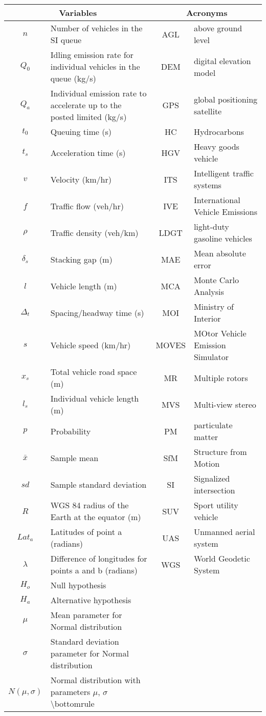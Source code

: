 \documentclass[preprint,12pt,a4paper]{elsarticle}
\begin{document}
\begin{linenumbers}
\begin{frontmatter}
\begin{tabular}{@{}cp{5cm} |cl@{}}
\toprule
\multicolumn{2}{c}{\textbf{Variables}} & \multicolumn{2}{c}{\textbf{Acronyms}} \\ \midrule
$n$ & Number of vehicles in the SI queue & AGL & above ground level \\
$Q_{0}$ & Idling emission rate for individual vehicles in the queue (kg/s) & DEM & digital elevation model \\
$Q_{a}$ & Individual emission rate to accelerate up to the posted limited (kg/s) & GPS & global positioning satellite \\
$t_{0}$ & Queuing time (s) & HC & Hydrocarbons \\
$t_{s}$ & Acceleration time (s) & HGV & Heavy goods vehicle \\
$v$ & Velocity (km/hr) & ITS & Intelligent traffic systems \\
$f$ & Traffic flow (veh/hr) & IVE & International Vehicle Emissions \\
$\rho$ & Traffic density (veh/km) & LDGT & light-duty gasoline vehicles \\
$\delta_{s}$ & Stacking gap (m) & MAE & Mean absolute error \\
$l$ & Vehicle length (m) & MCA & Monte Carlo Analysis \\
$\Delta_{t}$ & Spacing/headway time (s) & MOI & Ministry of Interior \\
$s$ & Vehicle speed (km/hr) & MOVES & MOtor Vehicle Emission Simulator \\
$x_{s}$ & Total vehicle road space (m) & MR & Multiple rotors \\
$l_{s}$ & Individual vehicle length (m) & MVS & Multi-view stereo \\
$p$ & Probability & PM & particulate matter \\
$\bar{x}$ & Sample mean & SfM & Structure from Motion \\
$sd$ & Sample standard deviation & SI & Signalized intersection \\
$R$ & WGS 84 radius of the Earth at the equator (m) & SUV & Sport utility vehicle \\
$Lat_{a}$ & Latitudes of point a (radians) & UAS & Unmanned aerial system \\
$\lambda$ & Difference of longitudes for points a and b (radians) & WGS & World Geodetic System \\
$H_{o}$ & Null hypothesis & \multicolumn{1}{l}{} &  \\
$H_{a}$ & Alternative hypothesis & \multicolumn{1}{l}{} &  \\
$\mu$ & Mean parameter for Normal distribution & \multicolumn{1}{l}{} &  \\
$\sigma$ & Standard deviation parameter for Normal distribution & \multicolumn{1}{l}{} &  \\
$N(\mu,\sigma)$ & Normal distribution with parameters $\mu$, $\sigma$  \textbackslash{}bottomrule & \multicolumn{1}{l}{} &  \\ \bottomrule
\end{tabular}


\end{frontmatter}
\end{linenumbers}
\end{document}
